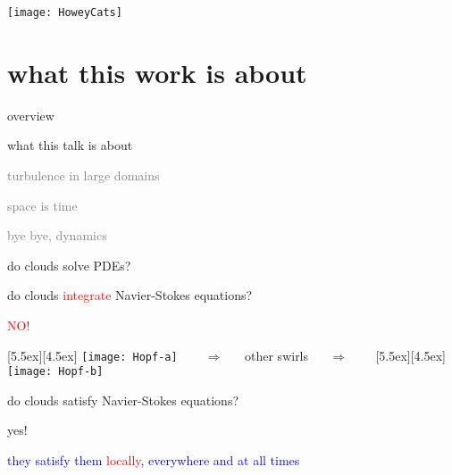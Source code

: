 \begin{frame}{}
\begin{center}
\texttt{[image: HoweyCats]}
\end{center}
\end{frame}

\begin{frame}
  \titlepage
\end{frame}


\section[what this work is about]
 {what this work is about}

\begin{frame}{overview}
\begin{enumerate}
              \item {\Large
what this talk is about
                  }\textcolor{gray}{\small
              \item
turbulence in large domains
              \item
space is time
              \item
bye bye, dynamics
                    }
            \end{enumerate}
\end{frame}

\begin{frame}{do clouds solve PDEs?}

do clouds \textcolor{red}{integrate} Navier-Stokes equations?

\begin{center}
\centerline{\textcolor{red}{\Huge NO!}}

\begin{minipage}[t]{\textwidth}
	\begin{center}
\centerline{
\raisebox{-4.0ex}[5.5ex][4.5ex]
		 {\texttt{[image: Hopf-a]}}
~~~ $\Longrightarrow$ ~~ {other swirls} ~~ $\Longrightarrow$ ~~~
	\raisebox{-4.0ex}[5.5ex][4.5ex]
		 {\texttt{[image: Hopf-b]}}
          }
	\end{center}
\end{minipage}
\end{center}

do clouds satisfy Navier-Stokes equations?

\bigskip

{\Large yes!}

\centerline{
\textcolor{blue}{they satisfy them \textcolor{red}{\large locally}, everywhere and at all times}
}
\end{frame}

